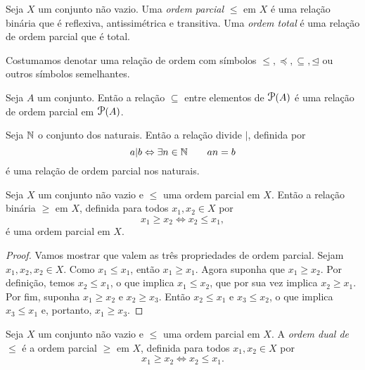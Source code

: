 \begin{defi}
	Seja $X$ um conjunto não vazio. Uma \emph{ordem parcial} $\leq$ em $X$ é uma relação binária que é reflexiva, antissimétrica e transitiva. Uma \emph{ordem total} é uma relação de ordem parcial que é total.
\end{defi}

	Costumamos denotar uma relação de ordem com símbolos $\leq, \preceq, \subseteq, \unlhd$ ou outros símbolos semelhantes.
	
\begin{ex}
	Seja $A$ um conjunto. Então a relação $\subseteq$ entre elementos de $\p(A)$ é uma relação de ordem parcial em $\p(A)$.
\end{ex}

\begin{ex}
	Seja $\mathbb{N}$ o conjunto dos naturais. Então a relação divide $|$, definida por
	\begin{equation*}
	a|b \Leftrightarrow \exists n \in \mathbb{N} \qquad an=b
	\end{equation*}
é uma relação de ordem parcial nos naturais.
\end{ex}

\begin{prop}
	Seja $X$ um conjunto não vazio e $\leq$ uma ordem parcial em $X$. Então a relação binária $\geq$ em $X$, definida para todos $x_1,x_2 \in X$ por
	\begin{equation*}
	x_1 \geq x_2 \Leftrightarrow x_2 \leq x_1,
	\end{equation*}
é uma ordem parcial em $X$.
\end{prop}
\begin{proof}
	Vamos mostrar que valem as três propriedades de ordem parcial. Sejam $x_1,x_2,x_2 \in X$. Como $x_1 \leq x_1$, então $x_1 \geq x_1$. Agora suponha que $x_1 \geq x_2$. Por definição, temos $x_2 \leq x_1$, o que implica $x_1 \leq x_2$, que por sua vez implica $x_2 \geq x_1$. Por fim, suponha $x_1 \geq x_2$ e $x_2 \geq x_3$. Então $x_2 \leq x_1$ e $x_3 \leq x_2$, o que implica $x_3 \leq x_1$ e, portanto, $x_1 \geq x_3$.
\end{proof}

\begin{defi}
	Seja $X$ um conjunto não vazio e $\leq$ uma ordem parcial em $X$. A \emph{ordem dual de $\leq$} é a ordem parcial $\geq$ em $X$, definida para todos $x_1,x_2 \in X$ por
	\begin{equation*}
	x_1 \geq x_2 \Leftrightarrow x_2 \leq x_1.
	\end{equation*}
\end{defi}

